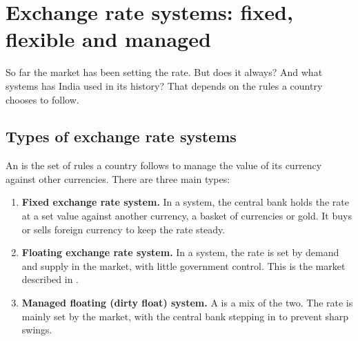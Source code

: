 \section{Exchange rate systems: fixed, flexible and managed}\label{sec:systems}

So far the market has been setting the rate. But does it always? And what systems has India used in its history? That depends on the rules a country chooses to follow.

\subsection{Types of exchange rate systems}
An  is the set of rules a country follows to manage the value of its currency against other currencies. There are three main types:

\begin{enumerate}[leftmargin=1.4em, label=\arabic*., itemsep=4pt]
\item \textbf{Fixed exchange rate system.} In a  system, the central bank holds the rate at a set value against another currency, a basket of currencies or gold. It buys or sells foreign currency to keep the rate steady.
\item \textbf{Floating exchange rate system.} In a  system, the rate is set by demand and supply in the market, with little government control. This is the market described in .
\item \textbf{Managed floating (dirty float) system.} A  is a mix of the two. The rate is mainly set by the market, with the central bank stepping in to prevent sharp swings.
\end{enumerate}

